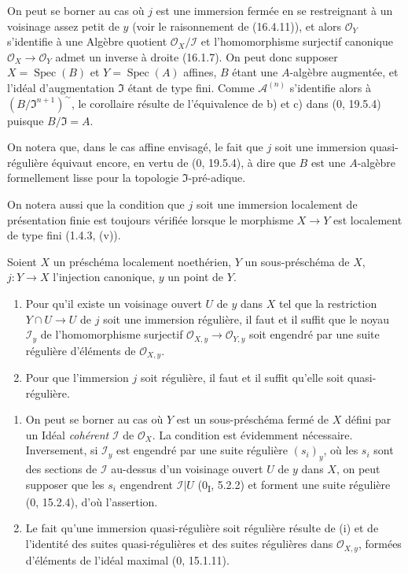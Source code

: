 On peut se borner au cas où $j$ est une immersion fermée en se restreignant
à un voisinage assez petit de $y$ (voir le raisonnement de (16.4.11)), et
alors $\mathcal{O}_Y$ s'identifie à une Algèbre quotient
$\mathcal{O}_X/\mathscr{I}$ et l'homomorphisme surjectif canonique
$\mathcal{O}_X\to\mathcal{O}_Y$ admet un
inverse à droite (16.1.7). On peut donc supposer
$X=\operatorname{Spec}(B)$ et $Y=\operatorname{Spec}(A)$ affines, $B$ étant
une $A$-algèbre augmentée, et l'idéal d'augmentation $\mathfrak{I}$ étant de
type fini. Comme $\mathscr{A}^{(n)}$ s'identifie alors à
$(B/\mathfrak{I}^{n+1})^{\sim}$, le corollaire résulte de l'équivalence de b)
et c) dans (0, 19.5.4) puisque $B/\mathfrak{I}=A$.

On notera que, dans le cas affine envisagé, le fait que $j$ soit une immersion
quasi-régulière équivaut encore, en vertu de (0, 19.5.4), à dire que $B$ est
une $A$-algèbre formellement lisse pour la topologie
$\mathfrak{I}$-pré-adique.

On notera aussi que la condition que $j$ soit une immersion localement de
présentation finie est toujours vérifiée lorsque le morphisme $X\to Y$ est
localement de type fini (1.4.3, (v)).

\begin{proposition}[16.9.10]
\label{IV.16.9.10}
Soient $X$ un préschéma localement noethérien, $Y$ un sous-préschéma de $X$,
$j:Y\to X$ l'injection canonique, $y$ un point de $Y$.
\begin{enumerate}
  \item[(i)] Pour qu'il existe un voisinage ouvert $U$ de $y$ dans $X$ tel que
  la restriction $Y\cap U\to U$ de $j$ soit une immersion régulière, il faut
  et il suffit que le noyau $\mathscr{I}_y$ de l'homomorphisme surjectif
  $\mathcal{O}_{X,y}\to\mathcal{O}_{Y,y}$ soit engendré par une suite régulière
  d'éléments de $\mathcal{O}_{X,y}$.
  \item[(ii)] Pour que l'immersion $j$ soit régulière, il faut et il suffit
  qu'elle soit quasi-régulière.
\end{enumerate}
\end{proposition}

\begin{enumerate}
  \item[(i)] On peut se borner au cas où $Y$ est un sous-préschéma fermé de
  $X$ défini par un Idéal \emph{cohérent} $\mathscr{I}$ de $\mathcal{O}_X$.
  La condition est évidemment nécessaire. Inversement, si $\mathscr{I}_y$
  est engendré par une suite régulière $(s_i)_y$, où les $s_i$ sont des
  sections de $\mathscr{I}$ au-dessus d'un voisinage ouvert $U$ de $y$ dans
  $X$, on peut supposer que les $s_i$ engendrent $\mathscr{I}|U$
  (0\textsubscript{I}, 5.2.2) et forment une suite régulière (0, 15.2.4),
  d'où l'assertion.
  \item[(ii)] Le fait qu'une immersion quasi-régulière soit régulière résulte
  de (i) et de l'identité des suites quasi-régulières et des suites régulières
  dans $\mathcal{O}_{X,y}$, formées d'éléments de l'idéal maximal
  (0, 15.1.11).
\end{enumerate}

